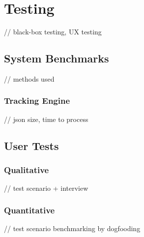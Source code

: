 \chapter{Testing}

// black-box testing, UX testing

\section{System Benchmarks}

// methods used

\subsection{Tracking Engine}

// json size, time to process

\section{User Tests}

\subsection{Qualitative}

// test scenario + interview

\subsection{Quantitative}

// test scenario benchmarking by dogfooding